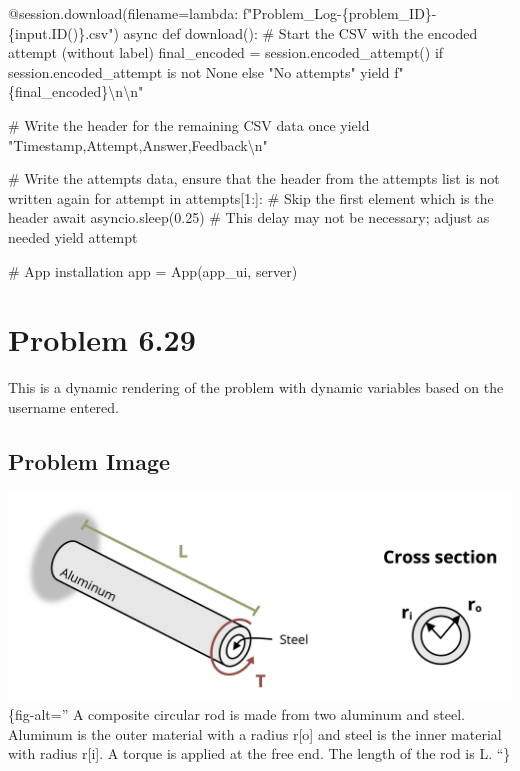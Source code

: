 \documentclass[
  letterpaper,
  DIV=11,
  numbers=noendperiod]{scrreprt}
\newenvironment{Shaded}{\begin{snugshade}}{\end{snugshade}}
\newcommand{\NormalTok}[1]{\textcolor[rgb]{0.00,0.23,0.31}{#1}}
\begin{document}
\begin{Shaded}
\begin{Highlighting}[]
\NormalTok{    @session.download(filename=lambda: f"Problem\_Log{-}\{problem\_ID\}{-}\{input.ID()\}.csv")}
\NormalTok{    async def download():}
\NormalTok{        \# Start the CSV with the encoded attempt (without label)}
\NormalTok{        final\_encoded = session.encoded\_attempt() if session.encoded\_attempt is not None else "No attempts"}
\NormalTok{        yield f"\{final\_encoded\}\textbackslash{}n\textbackslash{}n"}
        
\NormalTok{        \# Write the header for the remaining CSV data once}
\NormalTok{        yield "Timestamp,Attempt,Answer,Feedback\textbackslash{}n"}
        
\NormalTok{        \# Write the attempts data, ensure that the header from the attempts list is not written again}
\NormalTok{        for attempt in attempts[1:]:  \# Skip the first element which is the header}
\NormalTok{            await asyncio.sleep(0.25)  \# This delay may not be necessary; adjust as needed}
\NormalTok{            yield attempt}


\NormalTok{\# App installation}
\NormalTok{app = App(app\_ui, server)}
\end{Highlighting}
\end{Shaded}

\chapter*{Problem 6.29}\label{problem-6.29}


This is a dynamic rendering of the problem with dynamic variables based
on the username entered.

\section*{Problem Image}\label{problem-image-51}


\includegraphics{images/289.png}\{fig-alt='' A composite circular rod is
made from two aluminum and steel. Aluminum is the outer material with a
radius r{[}o{]} and steel is the inner material with radius r{[}i{]}. A
torque is applied at the free end. The length of the rod is L. ``\}
\end{document}
